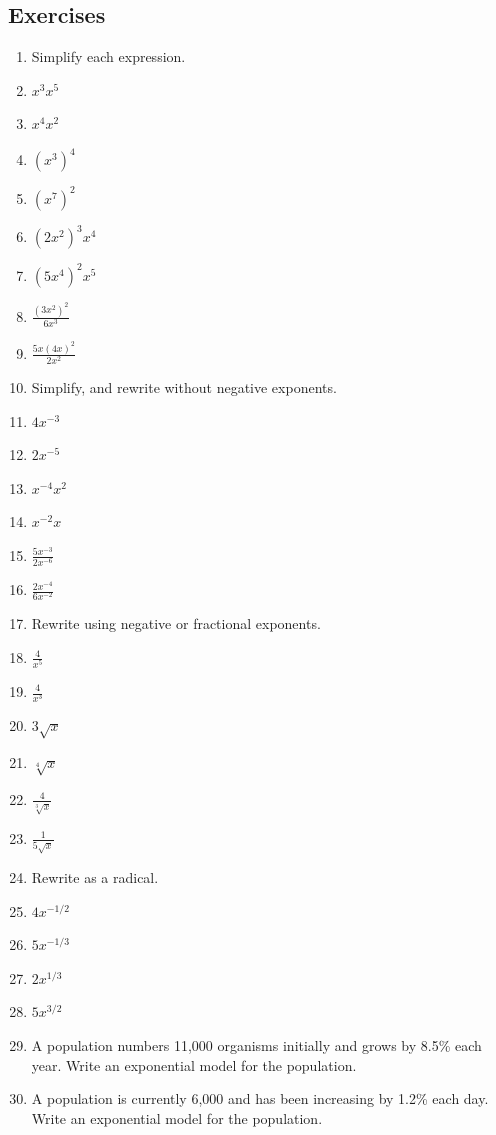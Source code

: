 \subsection{Exercises}
\label{ssec:1-6-exercises}
\begin{enumerate}
\item[] Simplify each expression.
\item $x^3x^5$
\item $x^4x^2$
\item $(x^3)^4$
\item $(x^7)^2$
\item $(2x^2)^3x^4$
\item $(5x^4)^2 x^5$
\item $\frac{(3x^2)^2}{6x^3}$
\item $\frac{5x(4x)^2}{2x^2}$

\item[] Simplify, and rewrite without negative exponents.
\item $4x^{-3}$
\item $2x^{-5}$
\item $x^{-4}x^2$
\item $x^{-2}x$
\item $\frac{5x^{-3}}{2x^{-6}}$
\item $\frac{2x^{-4}}{6x^{-2}}$

\item[] Rewrite using negative or fractional exponents.
\item $\frac{4}{x^{5}}$
\item $\frac{4}{x^3}$
\item $3\sqrt{x}$
\item $\sqrt[4]{x}$
\item $\frac{4}{\sqrt[3]{x}}$
\item $\frac{1}{5\sqrt{x}}$

\item[] Rewrite as a radical.
\item $4x^{-1/2}$
\item $5x^{-1/3}$
\item $2x^{1/3}$
\item $5x^{3/2}$


  \item A population numbers 11,000 organisms initially and grows by 8.5\% each year.  Write an exponential model for the population.

  \item A population is currently 6,000 and has been increasing by 1.2\% each day.  Write an exponential model for the population.


\end{enumerate}
